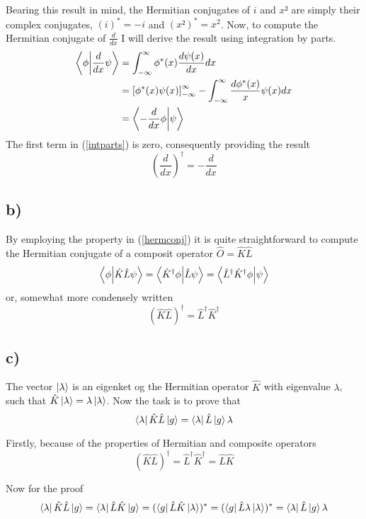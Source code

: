 \documentclass{article}
\begin{document}
Bearing this result in mind, the Hermitian conjugates of $i$ and $x²$ are simply their complex conjugates, $(i)^*=-i$ and $(x²)^*=x^2$. Now, to compute the Hermitian conjugate of $\frac{d}{dx}$ I will derive the result using integration by parts.
\begin{align}
\braket{\phi}{\frac{d}{dx}\psi}&=\int_{-\infty}^{\infty}\phi^*(x)\frac{d\psi(x)}{dx} dx\\
&=\left[\phi^*(x)\psi(x)\right]_{-\infty}^{\infty}
-\int_{-\infty}^{\infty}\frac{d\phi^*(x)}{x}\psi(x) dx \label{intparts}\\
&= \braket{-\frac{d}{dx}\phi}{\psi}
\end{align}
The first term in (\ref{intparts}) is zero, consequently providing the result
\begin{equation}
\left(\frac{d}{dx} \right)^{\dagger} = -\frac{d}{dx}
\end{equation}

\subsection*{b)}
By employing the property in (\ref{hermconj}) it is quite straightforward to compute the Hermitian conjugate of a composit operator $\hat{O}=\hat{K}\hat{L}$
\begin{equation}
\braket{\phi}{\hat{K}\hat{L}\psi}=\braket{\hat{K}^{\dagger}\phi}{\hat{L}\psi}=\braket{\hat{L}^{\dagger}\hat{K}^{\dagger}\phi}{\psi}
\end{equation}
or, somewhat more condensely written
\begin{equation}
(\hat{K}\hat{L})^{\dagger}=\hat{L}^{\dagger}\hat{K}^{\dagger}
\end{equation}

\subsection*{c)}

The vector $\ket{\lambda}$ is an eigenket og the Hermitian operator $\hat{K}$ with eigenvalue $\lambda$, such that $\hat{K}\ket{\lambda}=\lambda\ket{\lambda}$. Now the task is to prove that
\begin{equation}
\bra{\lambda}\hat{K}\hat{L}\ket{g}=\bra{\lambda}\hat{L}\ket{g}\lambda
\end{equation}

Firstly, because of the properties of Hermitian and composite operators
\begin{equation}
(\hat{K}\hat{L})^{\dagger}=\hat{L}^{\dagger}\hat{K}^{\dagger}=\hat{L}\hat{K}
\end{equation}

Now for the proof
\begin{equation}
\bra{\lambda}\hat{K}\hat{L}\ket{g}=\bra{\lambda}\hat{L}\hat{K}\ket{g}=
(\bra{g}\hat{L}\hat{K}\ket{\lambda})^*=(\bra{g}\hat{L}\lambda\ket{\lambda})^*=\bra{\lambda}\hat{L}\ket{g}\lambda
\end{equation}
\end{document}
